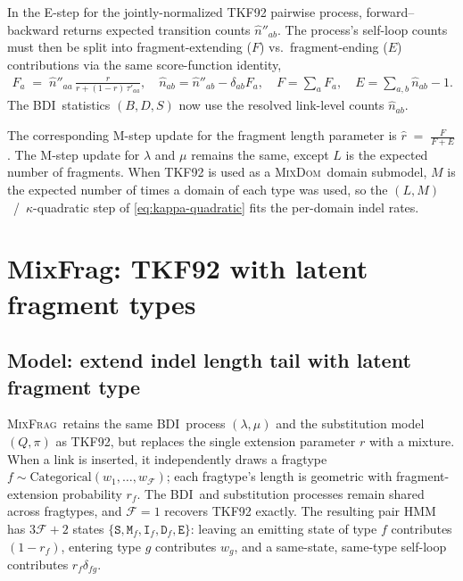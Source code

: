 \documentclass{article}
\newcommand{\MixFrag}{\textsc{MixFrag}}
\newcommand{\MixDom}{\textsc{MixDom}}
\newcommand{\BDI}{\textsc{BDI}}
\newcommand{\ins}{\lambda}
\newcommand{\del}{\mu}
\newcommand{\ext}{r}
\newcommand{\eqm}{\pi}
\newcommand{\hst}[1]{\texttt{#1}}
\begin{document}
In the E-step for the jointly-normalized TKF92 pairwise process, forward--backward returns expected transition counts $\hat n''_{ab}$. The process's self-loop counts must then
be split into fragment-extending ($F$) vs.\ fragment-ending ($E$) contributions via the same
score-function identity,
\begin{equation}
\label{eq:resolve}
\begin{gathered}
F_a \;=\; \hat n''_{aa}\,\frac{\ext}{\ext+(1-\ext)\,\tau'_{aa}},\quad
\hat n_{ab} = \hat n''_{ab}-\delta_{ab}F_a,\quad
F = \sum_a F_a,\quad
E = \sum_{a,b}\hat n_{ab} - 1.
\end{gathered}
\end{equation}
The \BDI\ statistics $(B,D,S)$ now use the resolved link-level counts $\hat n_{ab}$.

The corresponding M-step update for the fragment length parameter is $\hat\ext \;=\; \frac{F}{F+E}$.  
The M-step update for $\lambda$ and $\mu$ remains the same, except $L$ is the expected number of fragments.  When TKF92 is used as a \MixDom\ domain submodel, $M$ is the
expected number of times a domain of each type was used, so the
$(L,M)$~/~$\kappa$-quadratic step of \eqref{eq:kappa-quadratic} fits the
per-domain indel rates.


\section{MixFrag: TKF92 with latent fragment types}
\label{sec:mixfrag}

\subsection{Model: extend indel length tail with latent fragment type}
\MixFrag\ retains the same \BDI\ process $(\ins,\del)$ and the substitution
model $(Q,\eqm)$ as TKF92, but replaces the single extension
parameter $\ext$ with a mixture. When a link is inserted, it independently draws
a fragtype $f\sim\mathrm{Categorical}(w_1,\dots,w_{\mathcal F})$; each fragtype's 
length is geometric with fragment-extension probability $r_f$.
The \BDI\ and substitution processes remain shared across fragtypes,
and $\mathcal F{=}1$ recovers TKF92 exactly. The resulting pair HMM has
$3\mathcal F{+}2$ states
$\{\hst{S},\hst{M}_f,\hst{I}_f,\hst{D}_f,\hst{E}\}$: leaving an emitting
state of type $f$ contributes $(1-r_f)$, entering type $g$ contributes
$w_g$, and a same-state, same-type self-loop contributes
$r_f\delta_{fg}$.
\end{document}

